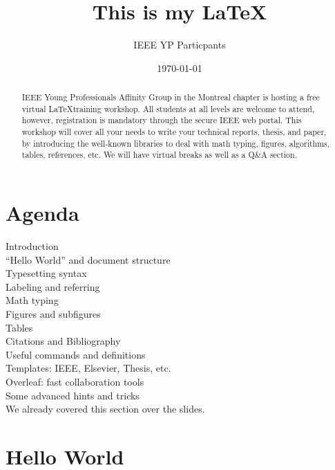 \documentclass{article}
\begin{document}
	
	
	\title{This is my \LaTeX}
	
	\author{IEEE YP Particpants}
	\date{\today}
	
	\maketitle
	
	
	\newpage
	\tableofcontents 
	\newpage
	
	
	
	
	\begin{abstract}
		IEEE Young Professionals Affinity Group in the Montreal chapter is hosting a free virtual \LaTeX training workshop. All students at all levels are welcome to attend, however, registration is mandatory through the secure IEEE web portal. This workshop will cover all your needs to write your technical reports, thesis, and paper, by introducing the well-known libraries to deal with math typing, figures, algorithms, tables, references, etc. We will have virtual breaks as well as a Q\&A section. 
	\end{abstract}
	
	
	\section{Agenda}
	
	
	
	
Introduction \\
“Hello World” and document structure  \\
Typesetting syntax \\
Labeling and referring  \\
Math typing  \\
Figures and subfigures \\
Tables \\
Citations and Bibliography \\
Useful commands and definitions \\
Templates: IEEE, Elsevier, Thesis, etc.  \\
Overleaf: fast collaboration tools\\
Some advanced hints and tricks \\




We already covered this section over the slides. 

\section{Hello World}
\label{sec:hello}
\end{document}

